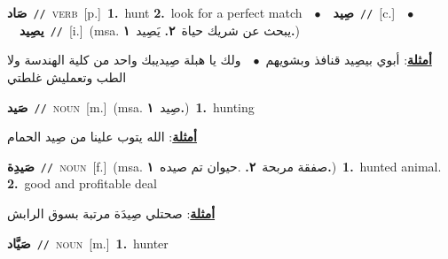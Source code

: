 \documentclass[10pt,a4paper,twoside]{article} %
\begin{document}
\begin{multicols}{2}
{\setlength\topsep{0pt}\textbf{\foreignlanguage{arabic}{صَاد}}\ {\color{gray}\texttt{//}\color{black}}\ \textsc{verb}\ [p.]\ \textbf{1.}~hunt  \textbf{2.}~look for a perfect match\ \ $\bullet$\ \ \setlength\topsep{0pt}\textbf{\foreignlanguage{arabic}{صِيد}}\ {\color{gray}\texttt{//}\color{black}}\ [c.]\ \ $\bullet$\ \ \setlength\topsep{0pt}\textbf{\foreignlanguage{arabic}{يصِيد}}\ {\color{gray}\texttt{//}\color{black}}\ [i.]\ \color{gray}(msa. \foreignlanguage{arabic}{يبحث عن شريك حياة}~\foreignlanguage{arabic}{\textbf{٢.}}  \foreignlanguage{arabic}{يَصِيد}~\foreignlanguage{arabic}{\textbf{١.}})\color{black}\  \begin{flushright}\color{gray}\foreignlanguage{arabic}{\textbf{\underline{\foreignlanguage{arabic}{أمثلة}}}: أبوي بيصِيد قنافذ وبشويهم\ $\bullet$\ \  ولك يا هبلة صِيديبك واحد من كلية الهندسة ولا الطب وتعمليش غلطتي}\end{flushright}\color{black}} \vspace{2mm}

{\setlength\topsep{0pt}\textbf{\foreignlanguage{arabic}{صَيد}}\ {\color{gray}\texttt{//}\color{black}}\ \textsc{noun}\ [m.]\ \color{gray}(msa. \foreignlanguage{arabic}{صِيد}~\foreignlanguage{arabic}{\textbf{١.}})\color{black}\ \textbf{1.}~hunting\  \begin{flushright}\color{gray}\foreignlanguage{arabic}{\textbf{\underline{\foreignlanguage{arabic}{أمثلة}}}: الله يتوب علينا من صِيد الحمام}\end{flushright}\color{black}} \vspace{2mm}

{\setlength\topsep{0pt}\textbf{\foreignlanguage{arabic}{صَيدِة}}\ {\color{gray}\texttt{//}\color{black}}\ \textsc{noun}\ [f.]\ \color{gray}(msa. \foreignlanguage{arabic}{صفقة مربحة}~\foreignlanguage{arabic}{\textbf{٢.}}  .\foreignlanguage{arabic}{حيوان تم صيده}~\foreignlanguage{arabic}{\textbf{١.}})\color{black}\ \textbf{1.}~hunted animal.  \textbf{2.}~good and profitable deal\  \begin{flushright}\color{gray}\foreignlanguage{arabic}{\textbf{\underline{\foreignlanguage{arabic}{أمثلة}}}: صحتلي صِيدَة مرتبة بسوق الرابش}\end{flushright}\color{black}} \vspace{2mm}

{\setlength\topsep{0pt}\textbf{\foreignlanguage{arabic}{صَيَّاد}}\ {\color{gray}\texttt{//}\color{black}}\ \textsc{noun}\ [m.]\ \textbf{1.}~hunter\ } \vspace{2mm}


\end{multicols}
\end{document}
